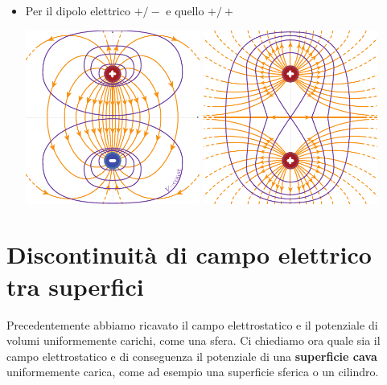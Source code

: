 \begin{examples}
\begin{itemize}
		\item Per il dipolo elettrico $+/-$ e quello $+/+$
		\begin{center}
			\includegraphics[width=0.45\textwidth]{images/chp3potcampodipolo1.pdf}\hspace{20pt}
			\includegraphics[width=0.45\textwidth]{images/chp3potcampodipolo2.pdf}
		\end{center}
	\end{itemize}
\end{examples}
\section{Discontinuità di campo elettrico tra superfici}
Precedentemente abbiamo ricavato il campo elettrostatico e il potenziale di volumi uniformemente carichi, come una sfera. Ci chiediamo ora quale sia il campo elettrostatico e di conseguenza il potenziale di una \textbf{superficie cava} uniformemente carica, come ad esempio una superficie sferica o un cilindro.
